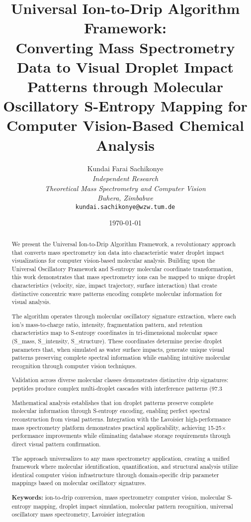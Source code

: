 \documentclass[12pt,a4paper]{article}
\title{\textbf{Universal Ion-to-Drip Algorithm Framework: \\ Converting Mass Spectrometry Data to Visual Droplet Impact Patterns through Molecular Oscillatory S-Entropy Mapping for Computer Vision-Based Chemical Analysis}}
\author{
Kundai Farai Sachikonye\\
\textit{Independent Research}\\
\textit{Theoretical Mass Spectrometry and Computer Vision}\\
\textit{Buhera, Zimbabwe}\\
\texttt{kundai.sachikonye@wzw.tum.de}
}
\date{\today}
\begin{document}
\maketitle

\begin{abstract}
We present the Universal Ion-to-Drip Algorithm Framework, a revolutionary approach that converts mass spectrometry ion data into characteristic water droplet impact visualizations for computer vision-based molecular analysis. Building upon the Universal Oscillatory Framework and S-entropy molecular coordinate transformation, this work demonstrates that mass spectrometry ions can be mapped to unique droplet characteristics (velocity, size, impact trajectory, surface interaction) that create distinctive concentric wave patterns encoding complete molecular information for visual analysis.

The algorithm operates through molecular oscillatory signature extraction, where each ion's mass-to-charge ratio, intensity, fragmentation pattern, and retention characteristics map to S-entropy coordinates in tri-dimensional molecular space (S_mass, S_intensity, S_structure). These coordinates determine precise droplet parameters that, when simulated as water surface impacts, generate unique visual patterns preserving complete spectral information while enabling intuitive molecular recognition through computer vision techniques.

Validation across diverse molecular classes demonstrates distinctive drip signatures: peptides produce complex multi-droplet cascades with interference patterns (97.3%

Mathematical analysis establishes that ion droplet patterns preserve complete molecular information through S-entropy encoding, enabling perfect spectral reconstruction from visual patterns. Integration with the Lavoisier high-performance mass spectrometry platform demonstrates practical applicability, achieving 15-25× performance improvements while eliminating database storage requirements through direct visual pattern confirmation.

The approach universalizes to any mass spectrometry application, creating a unified framework where molecular identification, quantification, and structural analysis utilize identical computer vision infrastructure through domain-specific drip parameter mappings based on molecular oscillatory signatures.

\textbf{Keywords:} ion-to-drip conversion, mass spectrometry computer vision, molecular S-entropy mapping, droplet impact simulation, molecular pattern recognition, universal oscillatory mass spectrometry, Lavoisier integration
\end{abstract}
\end{document}
